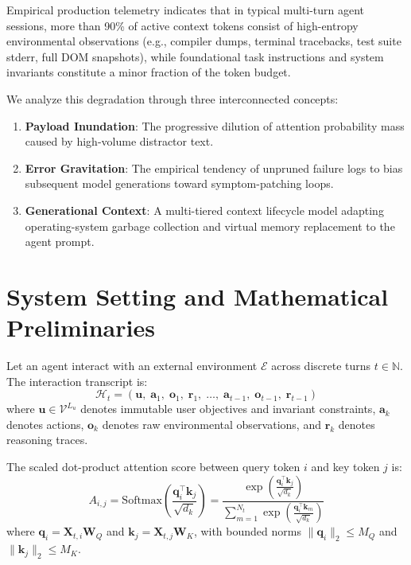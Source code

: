 \documentclass[11pt,a4paper]{article}
\begin{document}
Empirical production telemetry indicates that in typical multi-turn agent sessions, more than 90\% of active context tokens consist of high-entropy environmental observations (e.g., compiler dumps, terminal tracebacks, test suite stderr, full DOM snapshots), while foundational task instructions and system invariants constitute a minor fraction of the token budget.

We analyze this degradation through three interconnected concepts:
\begin{enumerate}
    \item \textbf{Payload Inundation}: The progressive dilution of attention probability mass caused by high-volume distractor text.
    \item \textbf{Error Gravitation}: The empirical tendency of unpruned failure logs to bias subsequent model generations toward symptom-patching loops.
    \item \textbf{Generational Context}: A multi-tiered context lifecycle model adapting operating-system garbage collection and virtual memory replacement to the agent prompt.
\end{enumerate}

\section{System Setting and Mathematical Preliminaries}
\label{sec:math_prelim}

Let an agent interact with an external environment $\mathcal{E}$ across discrete turns $t \in \mathbb{N}$. The interaction transcript is:
\begin{equation}
    \mathcal{H}_t = \left( \mathbf{u}, \; \mathbf{a}_1, \; \mathbf{o}_1, \; \mathbf{r}_1, \; \dots, \; \mathbf{a}_{t-1}, \; \mathbf{o}_{t-1}, \; \mathbf{r}_{t-1} \right)
\end{equation}
where $\mathbf{u} \in \mathcal{V}^{L_u}$ denotes immutable user objectives and invariant constraints, $\mathbf{a}_k$ denotes actions, $\mathbf{o}_k$ denotes raw environmental observations, and $\mathbf{r}_k$ denotes reasoning traces.

The scaled dot-product attention score between query token $i$ and key token $j$ is:
\begin{equation}
    A_{i,j} = \text{Softmax}\left( \frac{\mathbf{q}_i^\top \mathbf{k}_j}{\sqrt{d_k}} \right) = \frac{\exp\left( \frac{\mathbf{q}_i^\top \mathbf{k}_j}{\sqrt{d_k}} \right)}{\sum_{m=1}^{N_t} \exp\left( \frac{\mathbf{q}_i^\top \mathbf{k}_m}{\sqrt{d_k}} \right)}
\end{equation}
where $\mathbf{q}_i = \mathbf{X}_{t,i} \mathbf{W}_Q$ and $\mathbf{k}_j = \mathbf{X}_{t,j} \mathbf{W}_K$, with bounded norms $\|\mathbf{q}_i\|_2 \le M_Q$ and $\|\mathbf{k}_j\|_2 \le M_K$.
\end{document}
